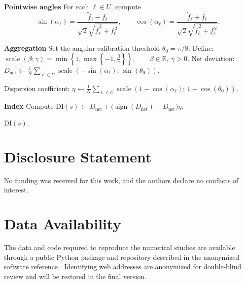 \documentclass[12pt]{imsart}
\theoremstyle{plain}
\theoremstyle{remark}
\begin{document}
\begin{algorithm}[H]
\begin{algorithmic}[1]
\Statex \textbf{Pointwise angles}
\State For each \(\ell\in U\), compute
\[
\sin(\alpha_\ell)
=
\frac{\widetilde f_\ell-f_\ell}
{\sqrt{2}\sqrt{\widetilde f_\ell^{\,2}+f_\ell^{\,2}}},
\qquad
\cos(\alpha_\ell)
=
\frac{\widetilde f_\ell+f_\ell}
{\sqrt{2}\sqrt{\widetilde f_\ell^{\,2}+f_\ell^{\,2}}}.
\]
\label{line:angles}

\Statex \textbf{Aggregation}
\State Set the angular calibration threshold \(\theta_0=\pi/8\).
\State Define: $\operatorname{scale}(\beta;\gamma)
=
\min\!\left\{1,\max\!\left\{-1,\frac{\beta}{\gamma}\right\}\right\},
\qquad \beta\in\mathbb R,\ \gamma>0.$
\State Net deviation:
\(
D_{\mathrm{net}}
\gets
\frac{1}{N}
\sum_{\ell\in U}
\operatorname{scale}\!\left(-\sin(\alpha_\ell);\,\sin(\theta_0)\right).
\)
\label{line:nd}

\State Dispersion coefficient:
\(
\eta
\gets
\frac{1}{N}
\sum_{\ell\in U}
\operatorname{scale}\!\left(1-\cos(\alpha_\ell);\,1-\cos(\theta_0)\right).
\)
\label{line:eta}

\Statex \textbf{Index}
\State Compute
\(
\mathrm{DI}(s)
\gets
D_{\mathrm{net}}
+
\bigl(\operatorname{sign}(D_{\mathrm{net}})-D_{\mathrm{net}}\bigr)\eta .
\)
\label{line:ddi}

\State \Return \(\mathrm{DI}(s)\).

\end{algorithmic}
\end{algorithm}

\section*{Disclosure Statement}
No funding was received for this work, and the authors declare no conflicts of interest.

\section*{Data Availability}
The data and code required to reproduce the numerical studies are available
through a public Python package and repository described in the anonymized
software reference \citep{graphical_sampling_2025_blind}. Identifying web
addresses are anonymized for double-blind review and will be restored in the
final version.


\end{document}
